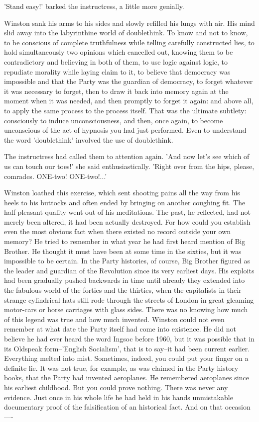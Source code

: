 \documentclass{article}
\begin{document}
'Stand easy!' barked the instructress, a little more genially.

Winston sank his arms to his sides and slowly refilled his lungs with air.
His mind slid away into the labyrinthine world of doublethink. To know
and not to know, to be conscious of complete truthfulness while telling
carefully constructed lies, to hold simultaneously two opinions which
cancelled out, knowing them to be contradictory and believing in both of
them, to use logic against logic, to repudiate morality while laying claim
to it, to believe that democracy was impossible and that the Party was the
guardian of democracy, to forget whatever it was necessary to forget, then
to draw it back into memory again at the moment when it was needed, and
then promptly to forget it again: and above all, to apply the same process
to the process itself. That was the ultimate subtlety: consciously to
induce unconsciousness, and then, once again, to become unconscious of
the act of hypnosis you had just performed. Even to understand the word
'doublethink' involved the use of doublethink.

The instructress had called them to attention again. 'And now let's see
which of us can touch our toes!' she said enthusiastically. 'Right over
from the hips, please, comrades. ONE-two! ONE-two!...'

Winston loathed this exercise, which sent shooting pains all the way from
his heels to his buttocks and often ended by bringing on another coughing
fit. The half-pleasant quality went out of his meditations. The past, he
reflected, had not merely been altered, it had been actually destroyed. For
how could you establish even the most obvious fact when there existed no
record outside your own memory? He tried to remember in what year he had
first heard mention of Big Brother. He thought it must have been at some
time in the sixties, but it was impossible to be certain. In the Party
histories, of course, Big Brother figured as the leader and guardian of the
Revolution since its very earliest days. His exploits had been gradually
pushed backwards in time until already they extended into the fabulous
world of the forties and the thirties, when the capitalists in their
strange cylindrical hats still rode through the streets of London in great
gleaming motor-cars or horse carriages with glass sides. There was no
knowing how much of this legend was true and how much invented. Winston
could not even remember at what date the Party itself had come into
existence. He did not believe he had ever heard the word Ingsoc before
1960, but it was possible that in its Oldspeak form--'English Socialism',
that is to say--it had been current earlier. Everything melted into mist.
Sometimes, indeed, you could put your finger on a definite lie. It was not
true, for example, as was claimed in the Party history books, that the
Party had invented aeroplanes. He remembered aeroplanes since his earliest
childhood. But you could prove nothing. There was never any evidence. Just
once in his whole life he had held in his hands unmistakable documentary
proof of the falsification of an historical fact. And on that occasion----
\end{document}
